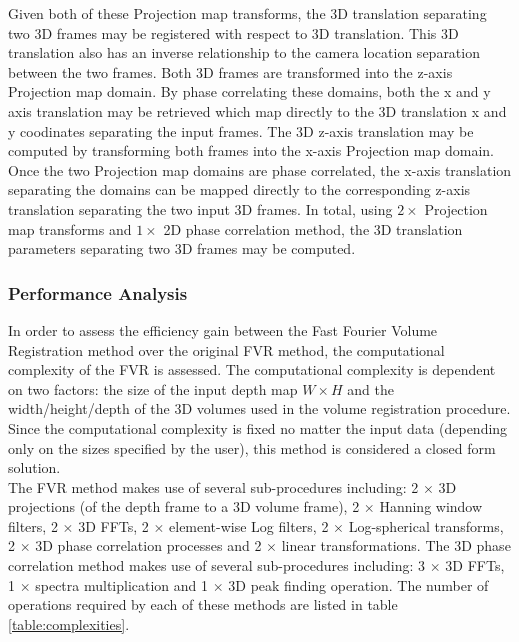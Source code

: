 Given both of these Projection map transforms, the 3D translation separating two 3D frames may be registered with respect to 3D translation. This 3D translation also has an inverse relationship to the camera location separation between the two frames. Both 3D frames are transformed into the z-axis Projection map domain. By phase correlating these domains, both the x and y axis translation may be retrieved which map directly to the 3D translation x and y coodinates separating the input frames. The 3D z-axis translation may be computed by transforming both frames into the x-axis Projection map domain. Once the two Projection map domains are phase correlated, the x-axis translation separating the domains can be mapped directly to the corresponding z-axis translation separating the two input 3D frames. In total, using $2 \times$ Projection map transforms and $1 \times$ 2D phase correlation method, the 3D translation parameters separating two 3D frames may be computed. \\

\subsubsection{Performance Analysis}

In order to assess the efficiency gain between the Fast Fourier Volume Registration method over the original FVR method, the computational complexity of the FVR is assessed. The computational complexity is dependent on two factors: the size of the input depth map $W \times H$ and the width/height/depth of the 3D volumes used in the volume registration procedure. Since the computational complexity is fixed no matter the input data (depending only on the sizes specified by the user), this method is considered a closed form solution. \\

The FVR method makes use of several sub-procedures including: 2 $\times$ 3D projections (of the depth frame to a 3D volume frame), 2 $\times$ Hanning window filters, 2 $\times$ 3D FFTs, 2 $\times$ element-wise Log filters, 2 $\times$ Log-spherical transforms, 2 $\times$ 3D phase correlation processes and 2 $\times$ linear transformations. The 3D phase correlation method makes use of several sub-procedures including: 3 $\times$ 3D FFTs, 1 $\times$ spectra multiplication and 1 $\times$ 3D peak finding operation. The number of operations required by each of these methods are listed in table \ref{table:complexities}. \\


